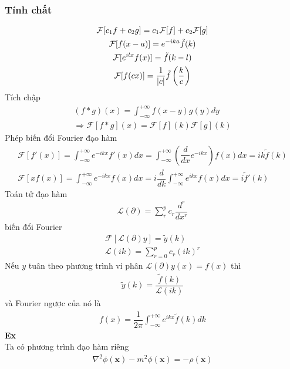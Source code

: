 \documentclass{article}
\newcommand{\f}[2]{\dfrac{#1}{#2}}
\begin{document}
\subsubsection*{Tính chất}
\begin{gather}
	\mathcal{F} [ c_{1} f + c_{2} g ] = c_{1} \mathcal{F}[f] + c_{2} \mathcal{F}[g]\\
	\mathcal{F} [ f(x - a) ] = e^{-i k a} \tilde{f}(k) \\
	\mathcal{F} [ e^{ilx} f(x)] = \tilde{f} (k - l)\\
	\mathcal{F} [f(cx)] = \f{1}{\abs{c}} \tilde{f} \left( \f{k}{c} \right)
\end{gather}
Tích chập
\begin{equation}
	\begin{aligned}
		\left(f * g\right)(x) = \int_{-\infty}^{+\infty} f(x - y)g(y) dy \\
		\Rightarrow \mathcal{F}[f * g](x) = \mathcal{F}[f](k) \mathcal{F}[g](k)
	\end{aligned}
\end{equation}
Phép biến đổi Fourier đạo hàm
\begin{gather}
	\mathcal{F}[f'(x)] = \int_{-\infty}^{+\infty} e^{-i k x} f'(x) dx = \int_{-\infty}^{+\infty} \left( \f{d}{dx} e^{- i k x} \right) f(x) dx = i k \tilde{f}(k)\\
	\mathcal{F}[x f(x)] = \int_{-\infty}^{+\infty} e^{-ikx} f(x) dx = i \f{d}{dk} \int_{-\infty}^{+\infty} e^{ikx} f(x) dx = i \tilde{f}' (k)
\end{gather}
Toán tử đạo hàm
\begin{gather}
	\mathcal{L}(\partial) = \sum_{r}^{p} c_{r} \f{d^{r}}{dx^{r}}
\end{gather}
biến đổi Fourier
\begin{gather}
	\mathcal{F}[\mathcal{L}(\partial)y] = \tilde{y}(k)\\
	\mathcal{L}(ik) = \sum_{r = 0}^{p} c_{r} (ik)^{r}
\end{gather}
Nếu $y$ tuân theo phương trình vi phân $\mathcal{L}(\partial) y(x) = f(x)$ thì
\begin{gather}
	\tilde{y}(k) = \f{\tilde{f}(k)}{\mathcal{L}(ik)}
\end{gather}
và Fourier ngược của nó là
\begin{gather}
	f(x) = \f{1}{2\pi} \int_{-\infty}^{+\infty} e^{ikx} \tilde{f}(k) dk
\end{gather}
\textbf{Ex}\\
Ta có phương trình đạo hàm riêng
\begin{gather}
	\nabla^{2} \phi(\mathbf{x}) - m^{2} \phi(\mathbf{x}) = - \rho(\mathbf{x})
\end{gather}
\end{document}
